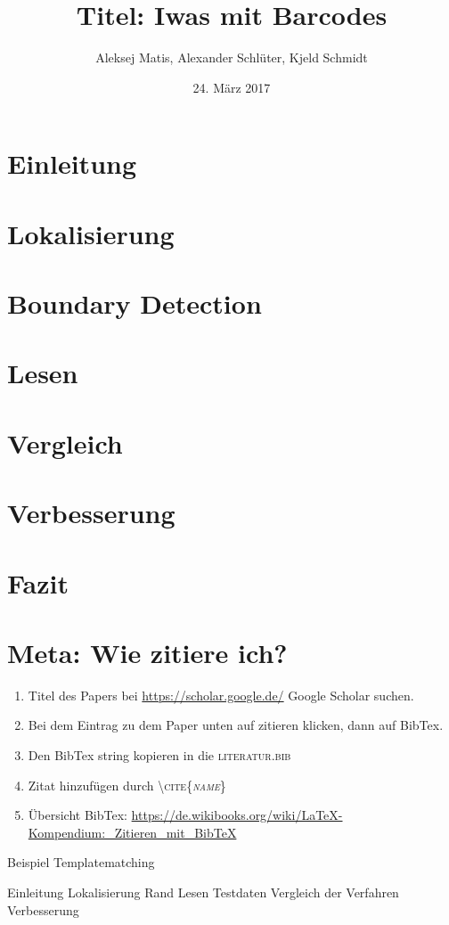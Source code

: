 \documentclass[12pt,a4paper]{article}
\author{Aleksej Matis, Alexander Schlüter, Kjeld Schmidt}
\title{Titel: Iwas mit Barcodes}
\date{24. März 2017}
\begin{document}

\setcounter{page}{0}
\maketitle
\thispagestyle{empty} 
\tableofcontents
\newpage
\section{Einleitung} 

\newpage

\section{Lokalisierung} 

\newpage

\section{Boundary Detection} 

\newpage

\section{Lesen} 
 
\newpage

\section{Vergleich} 

\newpage

\section{Verbesserung} 

\newpage

\section{Fazit} 

\newpage


\section{Meta: Wie zitiere ich?} 
\begin{enumerate}
\item Titel des Papers bei \url{https://scholar.google.de/} Google Scholar suchen.
\item Bei dem Eintrag zu dem Paper unten auf zitieren klicken, dann auf BibTex.
\item Den BibTex string kopieren in die \textsc{literatur.bib}
\item Zitat hinzufügen durch \textsc{\textbackslash cite\{\textit{name}\}}
\item Übersicht BibTex: \url{https://de.wikibooks.org/wiki/LaTeX-Kompendium:_Zitieren_mit_BibTeX}
\end{enumerate}
Beispiel Templatematching \cite{chen2014scanning}
%

Einleitung
Lokalisierung
Rand
Lesen
Testdaten
Vergleich der Verfahren
Verbesserung



%

\newpage
\appendix


\end{document}
